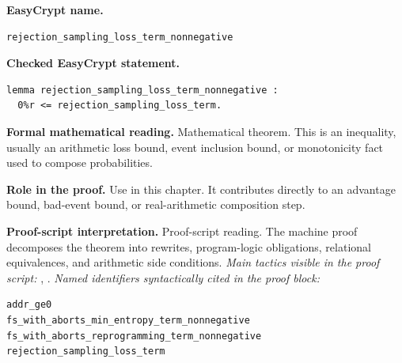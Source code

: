 \begin{formaltheorem}
\noindent\textbf{EasyCrypt name.}
\begin{lstlisting}[language=EasyCrypt,basicstyle=\ttfamily\scriptsize]
rejection_sampling_loss_term_nonnegative
\end{lstlisting}
\noindent\textbf{Checked EasyCrypt statement.}
\begin{lstlisting}[language=EasyCrypt,basicstyle=\ttfamily\scriptsize]
lemma rejection_sampling_loss_term_nonnegative :
  0%r <= rejection_sampling_loss_term.
\end{lstlisting}
\noindent\textbf{Formal mathematical reading.}
Mathematical theorem. This is an inequality, usually an arithmetic loss bound, event inclusion bound, or monotonicity fact used to compose probabilities.

\noindent\textbf{Role in the proof.}
Use in this chapter. It contributes directly to an advantage bound, bad-event bound, or real-arithmetic composition step.

\noindent\textbf{Proof-script interpretation.}
Proof-script reading. The machine proof decomposes the theorem into rewrites, program-logic obligations, relational equivalences, and arithmetic side conditions.
\emph{Main tactics visible in the proof script:} , .
\emph{Named identifiers syntactically cited in the proof block:}
\begin{lstlisting}[language=EasyCrypt,basicstyle=\ttfamily\scriptsize]
addr_ge0
fs_with_aborts_min_entropy_term_nonnegative
fs_with_aborts_reprogramming_term_nonnegative
rejection_sampling_loss_term
\end{lstlisting}

\end{formaltheorem}

